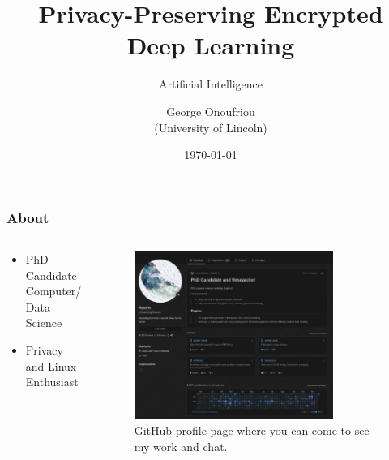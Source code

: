 \documentclass[aspectratio=169]{beamer}
\title{Privacy-Preserving Encrypted Deep Learning}
\subtitle{Artificial Intelligence}
\author{George Onoufriou\\(University of Lincoln)}
\date{\today}
\begin{document}

  \frame{\titlepage}

  \begin{frame}
    \frametitle{About}
    \begin{columns}
      \begin{column}{0.5\textwidth}
        \begin{itemize}
          \item PhD Candidate Computer/ Data Science
          \item Privacy and Linux Enthusiast
        \end{itemize}
      \end{column}
      \begin{column}{0.5\textwidth}
        \begin{figure}[th!]
          \centering
          \includegraphics[width=0.8\textwidth]{gh.png}
          \caption{GitHub profile page where you can come to see my work and chat. \autocite{repository}}
          \label{fig:gh}
        \end{figure}
      \end{column}
    \end{columns}
  \end{frame}
\end{document}
